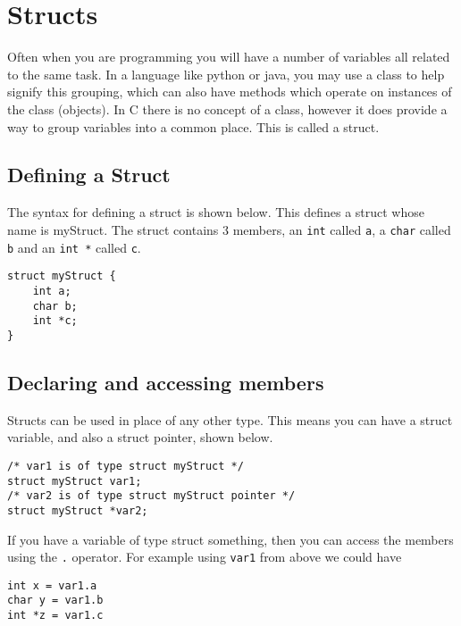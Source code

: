 
\chapter{Structs}



Often when you are programming you will have a number of variables all related to the same task.
In a language like python or java, you may use a class to help signify this grouping, which can also have methods which operate on instances of the class (objects).
In C there is no concept of a class, however it does provide a way to group variables into a common place.
This is called a struct.

\section{Defining a Struct}

The syntax for defining a struct is shown below.
This defines a struct whose name is myStruct.
The struct contains 3 members, an \texttt{int} called \texttt{a}, a \texttt{char} called \texttt{b} and an \texttt{int *} called \texttt{c}.

\begin{lstlisting}
struct myStruct {
    int a;
    char b;
    int *c;
}
\end{lstlisting}

\section{Declaring and accessing members}

Structs can be used in place of any other type.
This means you can have a struct variable, and also a struct pointer, shown below.

\begin{lstlisting}
/* var1 is of type struct myStruct */
struct myStruct var1; 
/* var2 is of type struct myStruct pointer */
struct myStruct *var2; 
\end{lstlisting}

If you have a variable of type struct something, then you can access the members using the \texttt{.} operator.
For example using \texttt{var1} from above we could have

\begin{lstlisting}
int x = var1.a
char y = var1.b
int *z = var1.c
\end{lstlisting}

